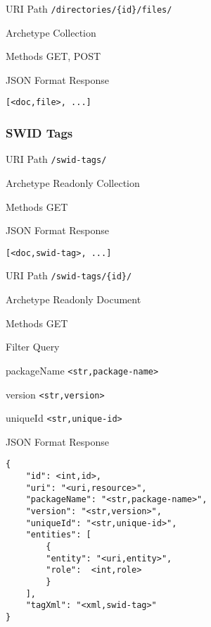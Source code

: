 \documentclass[10pt,a4paper]{scrartcl}
\begin{document}
\begin{mdframed}[style=def]
\begin{description*}
	\item[URI Path] \texttt{/directories/\{id\}/files/}
	\item[Archetype] Collection
	\item[Methods] GET, POST
	\item[JSON Format Response] \hfill
\begin{lstlisting}
[<doc,file>, ...]
\end{lstlisting}
\end{description*}
\end{mdframed}


\pagebreak


\subsubsection{SWID Tags}

\begin{mdframed}[style=def]
\begin{description*}
	\item[URI Path] \texttt{/swid-tags/}
	\item[Archetype] Readonly Collection
	\item[Methods] GET
	\item[JSON Format Response] \hfill
\begin{lstlisting}
[<doc,swid-tag>, ...]
\end{lstlisting}
\end{description*}
\end{mdframed}

\begin{mdframed}[style=def]
\begin{description*}
	\item[URI Path] \texttt{/swid-tags/\{id\}/}
	\item[Archetype] Readonly Document
	\item[Methods] GET
	\item[Filter Query] \hfill
	\begin{description*}
		\item[packageName] \texttt{<str,package-name>}
		\item[version] \texttt{<str,version>}
		\item[uniqueId] \texttt{<str,unique-id>}
	\end{description*}
	\item[JSON Format Response] \hfill
\begin{lstlisting}
{
	"id": <int,id>,
	"uri": "<uri,resource>",
	"packageName": "<str,package-name>",
	"version": "<str,version>",
	"uniqueId": "<str,unique-id>",
	"entities": [
		{
		"entity": "<uri,entity>",
		"role":  <int,role>
		}
	],
	"tagXml": "<xml,swid-tag>"
}
\end{lstlisting}
\end{description*}
\end{mdframed}
\end{document}
